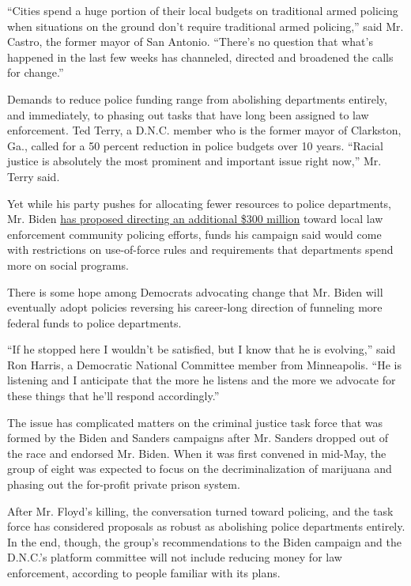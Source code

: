 ``Cities spend a huge portion of their local budgets on traditional
armed policing when situations on the ground don't require traditional
armed policing,'' said Mr. Castro, the former mayor of San Antonio.
``There's no question that what's happened in the last few weeks has
channeled, directed and broadened the calls for change.''

Demands to reduce police funding range from abolishing departments
entirely, and immediately, to phasing out tasks that have long been
assigned to law enforcement. Ted Terry, a D.N.C. member who is the
former mayor of Clarkston, Ga., called for a 50 percent reduction in
police budgets over 10 years. ``Racial justice is absolutely the most
prominent and important issue right now,'' Mr. Terry said.

Yet while his party pushes for allocating fewer resources to police
departments, Mr. Biden \href{https://joebiden.com/justice/}{has proposed
directing an additional \$300 million} toward local law enforcement
community policing efforts, funds his campaign said would come with
restrictions on use-of-force rules and requirements that departments
spend more on social programs.

There is some hope among Democrats advocating change that Mr. Biden will
eventually adopt policies reversing his career-long direction of
funneling more federal funds to police departments.

``If he stopped here I wouldn't be satisfied, but I know that he is
evolving,'' said Ron Harris, a Democratic National Committee member from
Minneapolis. ``He is listening and I anticipate that the more he listens
and the more we advocate for these things that he'll respond
accordingly.''

The issue has complicated matters on the criminal justice task force
that was formed by the Biden and Sanders campaigns after Mr. Sanders
dropped out of the race and endorsed Mr. Biden. When it was first
convened in mid-May, the group of eight was expected to focus on the
decriminalization of marijuana and phasing out the for-profit private
prison system.

After Mr. Floyd's killing, the conversation turned toward policing, and
the task force has considered proposals as robust as abolishing police
departments entirely. In the end, though, the group's recommendations to
the Biden campaign and the D.N.C.'s platform committee will not include
reducing money for law enforcement, according to people familiar with
its plans.

